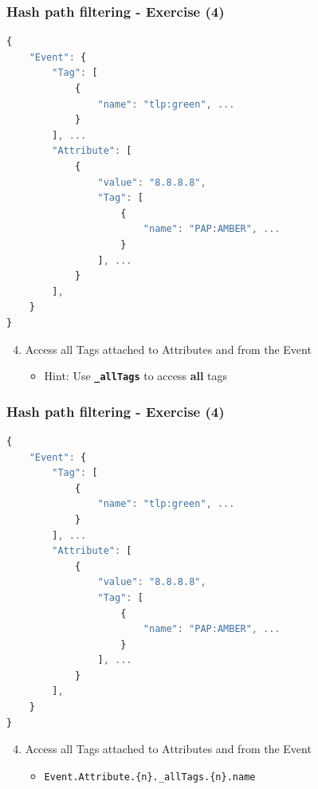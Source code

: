 \begin{frame}[fragile]
    \frametitle{Hash path filtering - Exercise (4)}

\begin{lstlisting}[language=javascript,firstnumber=1]
{
    "Event": {
        "Tag": [
            {
                "name": "tlp:green", ...
            }
        ], ...
        "Attribute": [
            {
                "value": "8.8.8.8",
                "Tag": [
                    {
                        "name": "PAP:AMBER", ...
                    }
                ], ...
            }
        ],
    }
}
\end{lstlisting}
    \begin{enumerate}
        \setcounter{enumi}{3}
        \item Access all Tags attached to Attributes and from the Event
        \begin{itemize}
            \item Hint: Use \texttt{\bf \_allTags} to access {\bf all} tags
        \end{itemize}
    \end{enumerate}
\end{frame}

\begin{frame}[fragile]
    \frametitle{Hash path filtering - Exercise (4)}

\begin{lstlisting}[language=javascript,firstnumber=1]
{
    "Event": {
        "Tag": [
            {
                "name": "tlp:green", ...
            }
        ], ...
        "Attribute": [
            {
                "value": "8.8.8.8",
                "Tag": [
                    {
                        "name": "PAP:AMBER", ...
                    }
                ], ...
            }
        ],
    }
}
\end{lstlisting}
    \begin{enumerate}
        \setcounter{enumi}{3}
        \item Access all Tags attached to Attributes and from the Event
        \begin{itemize}
            \item \texttt{Event.Attribute.\{n\}.\_allTags.\{n\}.name}
        \end{itemize}
    \end{enumerate}
\end{frame}

